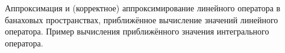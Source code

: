\documentclass[__main__.tex]{subfiles}
\begin{document}
Аппроксимация и (корректное) аппроксимирование линейного оператора в банаховых пространствах, приближённое вычисление значений линейного оператора. Пример вычисления приближённого значения интегрального оператора.
\end{document}
